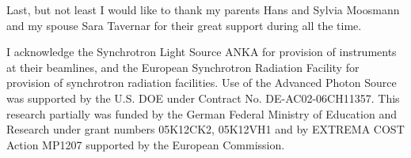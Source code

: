 \documentclass[
twoside,
openright,
titlepage,
numbers=noenddot,
headinclude,
fleqn,
a4paper,
footinclude=true,
cleardoublepage=empty,
abstractoff,
BCOR=5mm,
paper=a4,
fontsize=11pt,
british,ngerman,american,
]{scrreprt}
\begin{document}
Last, but not least I would like to thank my parents Hans and Sylvia
Moosmann and my spouse Sara Tavernar for their great support during
all the time.

I acknowledge the Synchrotron Light Source ANKA for provision of
instruments at their beamlines, and the European Synchrotron Radiation
Facility for provision of synchrotron radiation facilities.  Use of
the Advanced Photon Source was supported by the U.S. DOE under
Contract No. DE-AC02-06CH11357.  This research partially was funded by
the German Federal Ministry of Education and Research under grant
numbers 05K12CK2, 05K12VH1 and by EXTREMA COST Action MP1207 supported
by the European Commission.

\endgroup
\thispagestyle{empty}
\cleardoublepage


\end{document}

